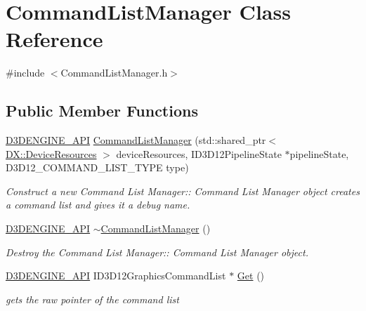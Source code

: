 \hypertarget{class_command_list_manager}{}\section{Command\+List\+Manager Class Reference}
\label{class_command_list_manager}


{\ttfamily \#include $<$Command\+List\+Manager.\+h$>$}

\subsection*{Public Member Functions}
\begin{DoxyCompactItemize}
\item 
\mbox{\hyperlink{stdafx_8h_a8ee2d990c5dfba7794dd2b60741d7722}{D3\+D\+E\+N\+G\+I\+N\+E\+\_\+\+A\+PI}} \mbox{\hyperlink{class_command_list_manager_a36f28ef11f13b7e86ca099bbaec184f6}{Command\+List\+Manager}} (std\+::shared\+\_\+ptr$<$ \mbox{\hyperlink{class_d_x_1_1_device_resources}{D\+X\+::\+Device\+Resources}} $>$ device\+Resources, I\+D3\+D12\+Pipeline\+State $\ast$pipeline\+State, D3\+D12\+\_\+\+C\+O\+M\+M\+A\+N\+D\+\_\+\+L\+I\+S\+T\+\_\+\+T\+Y\+PE type)
\begin{DoxyCompactList}\small\item\em Construct a new Command List Manager\+:\+: Command List Manager object creates a command list and gives it a debug name. \end{DoxyCompactList}\item 
\mbox{\hyperlink{stdafx_8h_a8ee2d990c5dfba7794dd2b60741d7722}{D3\+D\+E\+N\+G\+I\+N\+E\+\_\+\+A\+PI}} \mbox{\hyperlink{class_command_list_manager_abd86fdbb82a3488ff90c3d42524c0b88}{$\sim$\+Command\+List\+Manager}} ()
\begin{DoxyCompactList}\small\item\em Destroy the Command List Manager\+:\+: Command List Manager object. \end{DoxyCompactList}\item 
\mbox{\hyperlink{stdafx_8h_a8ee2d990c5dfba7794dd2b60741d7722}{D3\+D\+E\+N\+G\+I\+N\+E\+\_\+\+A\+PI}} I\+D3\+D12\+Graphics\+Command\+List $\ast$ \mbox{\hyperlink{class_command_list_manager_a59c3949f314d8a1ce9f9699cbd65bd70}{Get}} ()
\begin{DoxyCompactList}\small\item\em gets the raw pointer of the command list \end{DoxyCompactList}\item 

\end{DoxyCompactItemize}
